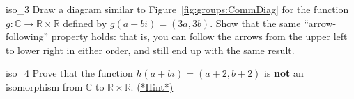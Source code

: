 \begin{exercise}{iso_3} 
Draw a diagram similar to Figure~\ref{fig:groups:CommDiag}  for the function $g: {\mathbb C} \rightarrow {\mathbb R} \times {\mathbb R}$ defined by $g(a + bi) = (3a, 3b)$. Show that the same ``arrow-following'' property holds: that is, you can follow the arrows from the upper left to lower right in either order, and still end up with the same result.
\end{exercise} 

\begin{exercise}{iso_4}
Prove that the function $h(a + bi) = (a+2, b+2)$ is {\bf not} an isomorphism from ${\mathbb C}$ to  ${\mathbb R} \times {\mathbb R}$.
\hyperref[sec:isomorph:hints]{(*Hint*)}
 \end{exercise}





